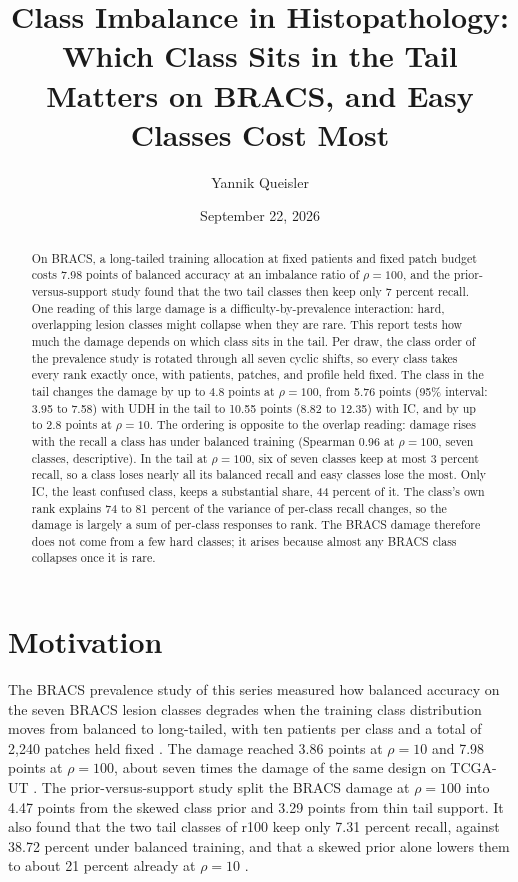 \documentclass[11pt]{article}
\title{Class Imbalance in Histopathology:\\Which Class Sits in the Tail Matters on BRACS, and Easy Classes Cost Most}
\author{Yannik Queisler}
\date{September 22, 2026}
\begin{document}
\raggedbottom
{}
\setlength{\emergencystretch}{2em}
\maketitle
\begin{abstract}
\noindent On BRACS, a long-tailed training allocation at fixed patients and fixed patch budget costs 7.98 points of balanced accuracy at an imbalance ratio of $\rho=100$, and the prior-versus-support study found that the two tail classes then keep only 7 percent recall. One reading of this large damage is a difficulty-by-prevalence interaction: hard, overlapping lesion classes might collapse when they are rare. This report tests how much the damage depends on which class sits in the tail. Per draw, the class order of the prevalence study is rotated through all seven cyclic shifts, so every class takes every rank exactly once, with patients, patches, and profile held fixed. The class in the tail changes the damage by up to 4.8 points at $\rho=100$, from 5.76 points (95\% interval: 3.95 to 7.58) with UDH in the tail to 10.55 points (8.82 to 12.35) with IC, and by up to 2.8 points at $\rho=10$. The ordering is opposite to the overlap reading: damage rises with the recall a class has under balanced training (Spearman 0.96 at $\rho=100$, seven classes, descriptive). In the tail at $\rho=100$, six of seven classes keep at most 3 percent recall, so a class loses nearly all its balanced recall and easy classes lose the most. Only IC, the least confused class, keeps a substantial share, 44 percent of it. The class's own rank explains 74 to 81 percent of the variance of per-class recall changes, so the damage is largely a sum of per-class responses to rank. The BRACS damage therefore does not come from a few hard classes; it arises because almost any BRACS class collapses once it is rare.
\end{abstract}

\section{Motivation}
\label{sec:motivation}
The BRACS prevalence study of this series measured how balanced accuracy on the seven BRACS lesion classes degrades when the training class distribution moves from balanced to long-tailed, with ten patients per class and a total of 2,240 patches held fixed \citep{queisler2026prevalenceBracs}. The damage reached 3.86 points at $\rho=10$ and 7.98 points at $\rho=100$, about seven times the damage of the same design on TCGA-UT \citep{queisler2026prevalenceTcga}. The prior-versus-support study split the BRACS damage at $\rho=100$ into 4.47 points from the skewed class prior and 3.29 points from thin tail support. It also found that the two tail classes of r100 keep only 7.31 percent recall, against 38.72 percent under balanced training, and that a skewed prior alone lowers them to about 21 percent already at $\rho=10$ \citep{queisler2026causeBracs}.
\end{document}
